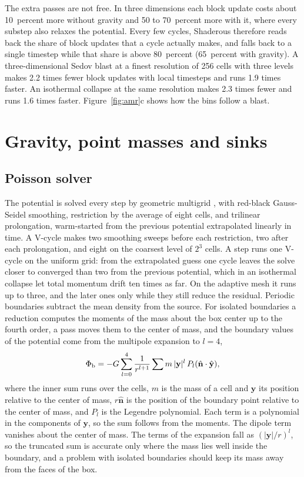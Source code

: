 \documentclass[twocolumn]{aastex701}
\begin{document}
The extra passes are not free. In three dimensions each block update costs about 10~percent more without gravity and 50 to 70~percent more with it, where every substep also relaxes the potential. Every few cycles, Shaderous therefore reads back the share of block updates that a cycle actually makes, and falls back to a single timestep while that share is above 80~percent (65~percent with gravity). A three-dimensional Sedov blast at a finest resolution of 256 cells with three levels makes 2.2 times fewer block updates with local timesteps and runs 1.9 times faster. An isothermal collapse at the same resolution makes 2.3 times fewer and runs 1.6 times faster. Figure~\ref{fig:amr}c shows how the bins follow a blast.


\section{Gravity, point masses and sinks}
\label{sec:gravity}

\subsection{Poisson solver}
\label{sec:poisson}

The potential is solved every step by geometric multigrid \citep{Brandt1977}, with red-black Gauss-Seidel smoothing, restriction by the average of eight cells, and trilinear prolongation, warm-started from the previous potential extrapolated linearly in time. A V-cycle makes two smoothing sweeps before each restriction, two after each prolongation, and eight on the coarsest level of $2^3$ cells. A step runs one V-cycle on the uniform grid: from the extrapolated guess one cycle leaves the solve closer to converged than two from the previous potential, which in an isothermal collapse let total momentum drift ten times as far. On the adaptive mesh it runs up to three, and the later ones only while they still reduce the residual. Periodic boundaries subtract the mean density from the source. For isolated boundaries a reduction computes the moments of the mass about the box center up to the fourth order, a pass moves them to the center of mass, and the boundary values of the potential come from the multipole expansion to $l = 4$,
\begin{equation*}
\Phi_{\rm b} = -G\sum_{l=0}^{4}\frac{1}{r^{l+1}}\sum m\,|\mathbf{y}|^l\,P_l(\hat{\mathbf{n}}\cdot\hat{\mathbf{y}}),
\end{equation*}
where the inner sum runs over the cells, $m$ is the mass of a cell and $\mathbf{y}$ its position relative to the center of mass, $r\hat{\mathbf{n}}$ is the position of the boundary point relative to the center of mass, and $P_l$ is the Legendre polynomial. Each term is a polynomial in the components of $\mathbf{y}$, so the sum follows from the moments. The dipole term vanishes about the center of mass. The terms of the expansion fall as $(|\mathbf{y}|/r)^l$, so the truncated sum is accurate only where the mass lies well inside the boundary, and a problem with isolated boundaries should keep its mass away from the faces of the box.
\end{document}
